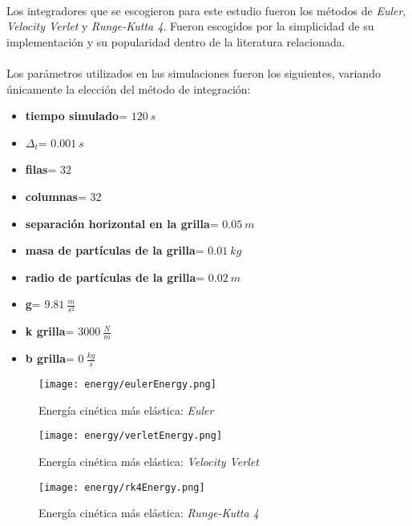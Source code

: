 \documentclass[12pt, twocolumn]{article}
\begin{document}
	\paragraph{} Los integradores que se escogieron para este estudio fueron los métodos de \textit{Euler}, \textit{Velocity Verlet} y \textit{Runge-Kutta 4}. Fueron escogidos por la simplicidad de su implementación y su popularidad dentro de la literatura relacionada. 
	
	\paragraph{} Los parámetros utilizados en las simulaciones fueron los siguientes, variando únicamente la elección del método de integración:
	\begin{itemize}
        \item \textbf{tiempo simulado}=  $120\:s$
        \item \textbf{$\Delta_{t}$}= $0.001\:s$
        \item \textbf{filas}= $32$
        \item \textbf{columnas}= $32$
        \item \textbf{separación horizontal en la grilla}= $0.05\:m$
        \item \textbf{masa de partículas de la grilla}= $0.01\:kg$
        \item \textbf{radio de partículas de la grilla}= $0.02\:m$
        \item \textbf{g}= $9.81\:\frac{m}{s^2}$
        \item \textbf{k grilla}= $3000\:\frac{N}{m}$
        \item \textbf{b grilla}= $0\:\frac{kg}{s}$
	\end{itemize}
	
	\begin{figure}[H]
		\centering
		\texttt{[image: energy/eulerEnergy.png]}
		\caption{Energía cinética más elástica: \textit{Euler}}
		\label{energy1}
	\end{figure}
	
	\begin{figure}[H]
		\texttt{[image: energy/verletEnergy.png]}
		\caption{Energía cinética más elástica: \textit{Velocity Verlet}}
		\label{energy2}
		\centering
	\end{figure} 
	
	\begin{figure}[H]
		\centering
		\texttt{[image: energy/rk4Energy.png]}
		\caption{Energía cinética más elástica: \textit{Runge-Kutta 4}}
		\label{energy3}
	\end{figure}
	
\end{document}
